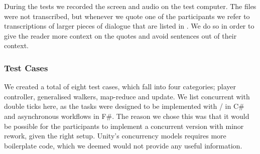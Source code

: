 During the tests we recorded the screen and audio on the test computer. The files were not transcribed, but whenever we quote one of the participants we refer to transcriptions of larger pieces of dialogue that are listed in . We do so in order to give the reader more context on the quotes and avoid  sentences out of their context.

\subsubsection{Test Cases} \label{sec:usability:test:cases}
We created a total of eight test cases, which fall into four categories; player controller, generalised walkers, map-reduce and  update. We list concurrent with double ticks here, as the tasks were designed to be implemented with / in C\# and asynchronous workflows in F\#. The reason we chose this was that it would be possible for the participants to implement a concurrent version with minor rework, given the right setup. Unity's concurrency models requires more boilerplate code, which we deemed would not provide any useful information.

